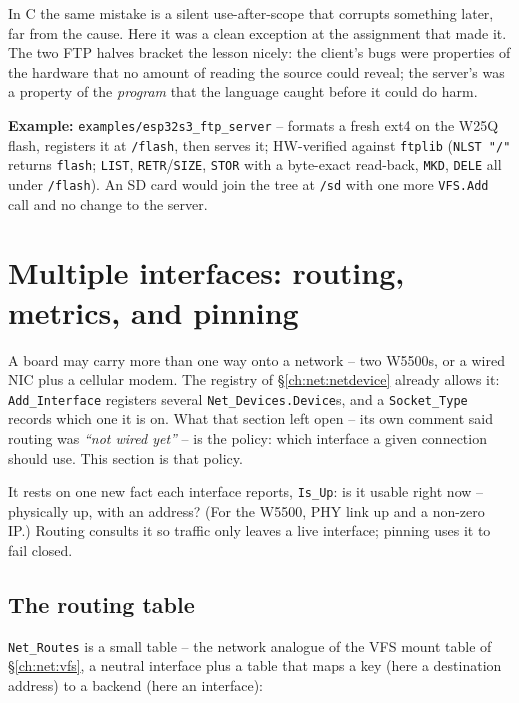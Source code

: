 In C the same mistake is a silent use-after-scope that corrupts something later, far
from the cause. Here it was a clean exception at the assignment that made it. The
two FTP halves bracket the lesson nicely: the client's bugs were properties of the
hardware that no amount of reading the source could reveal; the server's was a
property of the \emph{program} that the language caught before it could do harm.

\noindent\textbf{Example:} \texttt{examples/esp32s3\_ftp\_server} -- formats a
fresh ext4 on the W25Q flash, registers it at \texttt{/flash}, then serves it;
HW-verified against \texttt{ftplib} (\texttt{NLST "/"} returns \texttt{flash};
\texttt{LIST}, \texttt{RETR}/\texttt{SIZE}, \texttt{STOR} with a byte-exact
read-back, \texttt{MKD}, \texttt{DELE} all under \texttt{/flash}). An SD card would
join the tree at \texttt{/sd} with one more \texttt{VFS.Add} call and no change to
the server.

\section{Multiple interfaces: routing, metrics, and pinning}
\label{ch:net:multinic}

A board may carry more than one way onto a network -- two W5500s, or a wired NIC
plus a cellular modem. The registry of \S\ref{ch:net:netdevice} already allows it:
\texttt{Add\_Interface} registers several \texttt{Net\_Devices.Device}s, and a
\texttt{Socket\_Type} records which one it is on. What that section left open --
its own comment said routing was \emph{``not wired yet''} -- is the policy: which
interface a given connection should use. This section is that policy.

It rests on one new fact each interface reports, \texttt{Is\_Up}: is it usable right
now -- physically up, with an address? (For the W5500, PHY link up and a non-zero
IP.) Routing consults it so traffic only leaves a live interface; pinning uses it to
fail closed.

\subsection{The routing table}

\texttt{Net\_Routes} is a small table -- the network analogue of the VFS mount
table of \S\ref{ch:net:vfs}, a neutral interface plus a table that maps a key (here
a destination address) to a backend (here an interface):

